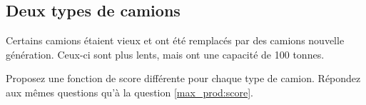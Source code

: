 \begin{comment}
\subsection{Décisions d'affectation à l'aide de règles complexes} 
\label{max_prod:code}


Vous devez maintenant programmer des règles de décision plus complexes en modifiant la classe CustomDecisionMaker. Plus précisément, 

\begin{itemize}
	\item Modifiez les fonctions \verb!computeDecisionScore! et \verb!computeCustomDecisionScore! pour créer une fonction de score pour l'affectation de camions aux pelles.
	\item Modifiez les fonctions \verb!selectReturnStation! et \verb!customSelectReturnStation! pour choisir vers quelle station de déchargement (quel stérile ou concentrateur) un camion ira se faire décharger.
\end{itemize}

\red{Peut-être seulement le deuxième point. Le premier point est redondant avec une question de la section suivante...}

\vspace{10pt}
\noindent\textbf{Dans votre réponse,} 

\begin{itemize}
	\item Décrivez brièvement vos algorithmes.
	\item Comparez la production obtenue avec votre formule d'assignation vos résultats de la question \ref{max_prod:score}.
\end{itemize}
\end{comment}

\subsection{Deux types de camions}
Certains camions étaient vieux et ont été remplacés par des camions nouvelle génération. Ceux-ci sont plus lents, mais ont une capacité de 100 tonnes.

Proposez une fonction de score différente pour chaque type de camion. Répondez aux mêmes questions qu'à la question \ref{max_prod:score}.

